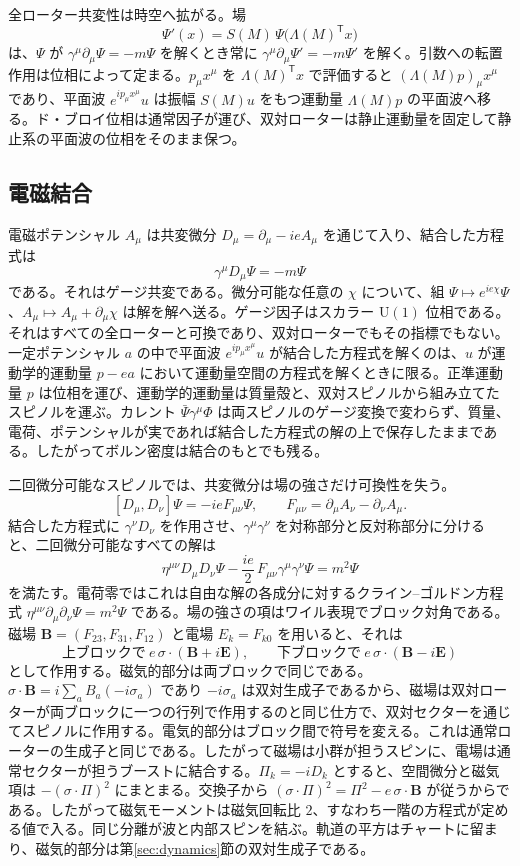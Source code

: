 \documentclass[a4paper]{article}
\begin{document}
全ローター共変性は時空へ拡がる。場
\[
\Psi'(x)=S(M)\,\Psi\bigl(\Lambda(M)^{\mathsf T}x\bigr)
\]
は、$\Psi$ が $\gamma^\mu\partial_\mu\Psi=-m\Psi$ を解くとき常に $\gamma^\mu\partial_\mu\Psi'=-m\Psi'$ を解く。引数への転置作用は位相によって定まる。$p_\mu x^\mu$ を $\Lambda(M)^{\mathsf T}x$ で評価すると $(\Lambda(M)p)_\mu x^\mu$ であり、平面波 $e^{ip_\mu x^\mu}u$ は振幅 $S(M)u$ をもつ運動量 $\Lambda(M)p$ の平面波へ移る。ド・ブロイ位相は通常因子が運び、双対ローターは静止運動量を固定して静止系の平面波の位相をそのまま保つ。

\subsection{電磁結合}

電磁ポテンシャル $A_\mu$ は共変微分 $D_\mu=\partial_\mu-ieA_\mu$ を通じて入り、結合した方程式は
\[
\gamma^\mu D_\mu\Psi=-m\Psi
\]
である。それはゲージ共変である。微分可能な任意の $\chi$ について、組 $\Psi\mapsto e^{ie\chi}\Psi$、$A_\mu\mapsto A_\mu+\partial_\mu\chi$ は解を解へ送る。ゲージ因子はスカラー $\mathrm{U}(1)$ 位相である。それはすべての全ローターと可換であり、双対ローターでもその指標でもない。一定ポテンシャル $a$ の中で平面波 $e^{ip_\mu x^\mu}u$ が結合した方程式を解くのは、$u$ が運動学的運動量 $p-ea$ において運動量空間の方程式を解くときに限る。正準運動量 $p$ は位相を運び、運動学的運動量は質量殻と、双対スピノルから組み立てたスピノルを運ぶ。カレント $\bar\Psi\gamma^\mu\Phi$ は両スピノルのゲージ変換で変わらず、質量、電荷、ポテンシャルが実であれば結合した方程式の解の上で保存したままである。したがってボルン密度は結合のもとでも残る。

二回微分可能なスピノルでは、共変微分は場の強さだけ可換性を失う。
\[
[D_\mu,D_\nu]\Psi=-ieF_{\mu\nu}\Psi,\qquad F_{\mu\nu}=\partial_\mu A_\nu-\partial_\nu A_\mu .
\]
結合した方程式に $\gamma^\nu D_\nu$ を作用させ、$\gamma^\mu\gamma^\nu$ を対称部分と反対称部分に分けると、二回微分可能なすべての解は
\[
\eta^{\mu\nu}D_\mu D_\nu\Psi-\frac{ie}{2}\,F_{\mu\nu}\gamma^\mu\gamma^\nu\Psi=m^2\Psi
\]
を満たす。電荷零ではこれは自由な解の各成分に対するクライン--ゴルドン方程式 $\eta^{\mu\nu}\partial_\mu\partial_\nu\Psi=m^2\Psi$ である。場の強さの項はワイル表現でブロック対角である。磁場 $\mathbf B=(F_{23},F_{31},F_{12})$ と電場 $E_k=F_{k0}$ を用いると、それは
\[
\text{上ブロックで}\ e\,\sigma\cdot(\mathbf B+i\mathbf E),\qquad
\text{下ブロックで}\ e\,\sigma\cdot(\mathbf B-i\mathbf E)
\]
として作用する。磁気的部分は両ブロックで同じである。$\sigma\cdot\mathbf B=i\sum_a B_a(-i\sigma_a)$ であり $-i\sigma_a$ は双対生成子であるから、磁場は双対ローターが両ブロックに一つの行列で作用するのと同じ仕方で、双対セクターを通じてスピノルに作用する。電気的部分はブロック間で符号を変える。これは通常ローターの生成子と同じである。したがって磁場は小群が担うスピンに、電場は通常セクターが担うブーストに結合する。$\Pi_k=-iD_k$ とすると、空間微分と磁気項は $-(\sigma\cdot\Pi)^2$ にまとまる。交換子から $(\sigma\cdot\Pi)^2=\Pi^2-e\,\sigma\cdot\mathbf B$ が従うからである。したがって磁気モーメントは磁気回転比 $2$、すなわち一階の方程式が定める値で入る。同じ分離が波と内部スピンを結ぶ。軌道の平方はチャートに留まり、磁気的部分は第\ref{sec:dynamics}節の双対生成子である。
\end{document}
